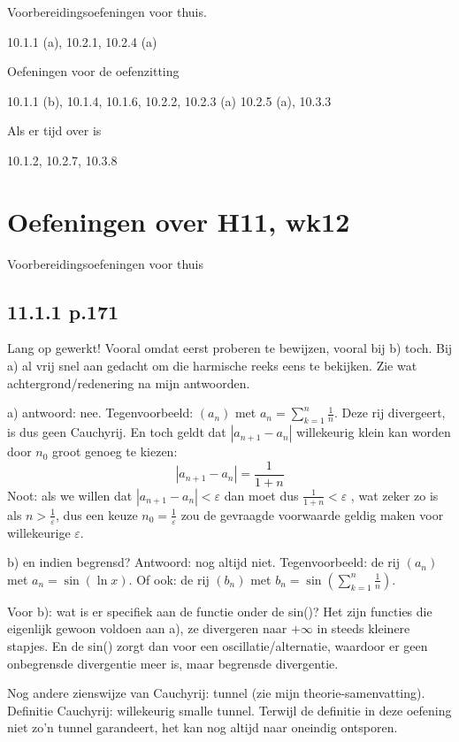 \documentclass{article}
\begin{document}
Voorbereidingsoefeningen voor thuis.

10.1.1 (a), 10.2.1, 10.2.4 (a) 



Oefeningen voor de oefenzitting 

 10.1.1 (b), 10.1.4, 10.1.6, 10.2.2, 10.2.3 (a) 10.2.5 (a), 10.3.3 

 Als er tijd over is 

10.1.2, 10.2.7, 10.3.8 

\section{Oefeningen over H11, wk12} 

Voorbereidingsoefeningen voor thuis

\subsection{11.1.1 p.171} 

Lang op gewerkt! 
Vooral omdat eerst proberen te bewijzen, vooral bij b) toch. 
Bij a) al vrij snel aan gedacht om die harmische reeks eens te bekijken. 
Zie wat achtergrond/redenering na mijn antwoorden. 

a) antwoord: nee. Tegenvoorbeeld: $(a_n)$ met $a_n = \sum_{k=1}^n \frac{1}{n}$. 
Deze rij divergeert, is dus geen Cauchyrij. En toch geldt dat $ |a_{n+1} - a_n| $ willekeurig klein kan worden door $n_0$ groot genoeg te kiezen: 
\[ |a_{n+1} - a_n| = \frac{1}{1+n} \] 
Noot: als we willen dat $|a_{n+1} - a_n| < \varepsilon$ dan moet dus $\frac{1}{1+n} < \varepsilon$ , wat zeker zo is als $n > \frac{1}{\varepsilon}$, dus een keuze $n_0 = \frac{1}{\varepsilon} $ zou de gevraagde voorwaarde geldig maken voor willekeurige $\varepsilon$. 

b) en indien begrensd? 
Antwoord: nog altijd niet. Tegenvoorbeeld: de rij $(a_n)$ met $a_n = \sin (\ln x)$. 
Of ook: de rij $(b_n)$ met $b_n = \sin (\sum_{k=1}^n \frac{1}{n})$. 

Voor b): wat is er specifiek aan de functie onder de sin()? Het zijn functies die eigenlijk gewoon voldoen aan a), ze divergeren naar $+\infty$ in steeds kleinere stapjes. En de sin() zorgt dan voor een oscillatie/alternatie, waardoor er geen onbegrensde divergentie meer is, maar begrensde divergentie. 

Nog andere zienswijze van Cauchyrij: tunnel (zie mijn theorie-samenvatting). Definitie Cauchyrij: willekeurig smalle tunnel. Terwijl de definitie in deze oefening niet zo'n tunnel garandeert, het kan nog altijd naar oneindig ontsporen. 
\end{document}

